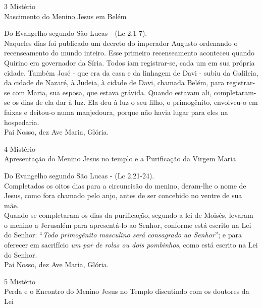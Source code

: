 \documentclass{book}
\begin{document}
\begin{center}
    3\textordmasculine{} Mistério \\ Nascimento do Menino Jesus em Belém
\end{center}
\begin{flushleft}
    Do Evangelho segundo São Lucas - (\textcolor{VioletRed2}{Lc 2,1-7}). \\
    \hfill{} \break{}
    Naqueles dias foi publicado um decreto do imperador Augusto ordenando o recenseamento do mundo inteiro. Esse primeiro recenseamento aconteceu quando Quirino era governador da Síria. Todos iam registrar-se, cada um em sua própria cidade. Também José - que era da casa e da linhagem de Davi - subiu da Galileia, da cidade de Nazaré, à Judeia, à cidade de Davi, chamada Belém, para registrar-se com Maria, sua esposa, que estava grávida. Quando estavam ali, completaram-se os dias de ela dar à luz. Ela deu à luz o seu filho, o primogênito, envolveu-o em faixas e deitou-o numa manjedoura, porque não havia lugar para eles na hospedaria. \\
    \hfill{} \break{}
    Pai Nosso, dez Ave Maria, Glória.
\end{flushleft}
\newpage
\begin{center}
    4\textordmasculine{} Mistério \\ Apresentação do Menino Jesus no templo e a Purificação da Virgem Maria
\end{center}
\begin{flushleft}
    Do Evangelho segundo São Lucas - (\textcolor{VioletRed2}{Lc 2,21-24}). \\
    \hfill{} \break{}
    Completados os oitos dias para a circuncisão do menino, deram-lhe o nome de Jesus, como fora chamado pelo anjo, antes de ser concebido no ventre de sua mãe.
    \vspace{.2cm} \\
    Quando se completaram os dias da purificação, segundo a lei de Moisés, levaram o menino a Jerusalém para apresentá-lo ao Senhor, conforme está escrito na Lei do Senhor: ``\textit{Todo primogênito masculino será consagrado ao Senhor}''; e para oferecer em sacrifício \textit{um par de rolas ou dois pombinhos}, como está escrito na Lei do Senhor. \\
    \hfill{} \break{}
    Pai Nosso, dez Ave Maria, Glória.
\end{flushleft}
\begin{center}
    5\textordmasculine{} Mistério \\ Perda e o Encontro do Menino Jesus no Templo discutindo com os doutores da Lei
\end{center}
\end{document}
